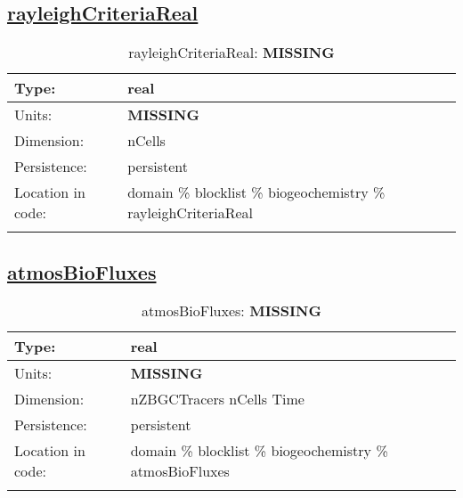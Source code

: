 \subsection[rayleighCriteriaReal]{\hyperref[sec:var_tab_biogeochemistry]{rayleighCriteriaReal}}
\label{subsec:var_sec_biogeochemistry_rayleighCriteriaReal}
\begin{center}
\begin{longtable}{| p{2.0in} | p{4.0in} |}
        \hline 
        Type: & real \\
        \hline 
        Units: & {\bf \color{red} MISSING} \\
        \hline 
        Dimension: & nCells \\
        \hline 
        Persistence: & persistent \\
        \hline 
         Location in code: & domain \% blocklist \% biogeochemistry \% rayleighCriteriaReal \\
         \hline 
    \caption{rayleighCriteriaReal: {\bf \color{red} MISSING}}
\end{longtable}
\end{center}
\subsection[atmosBioFluxes]{\hyperref[sec:var_tab_biogeochemistry]{atmosBioFluxes}}
\label{subsec:var_sec_biogeochemistry_atmosBioFluxes}
\begin{center}
\begin{longtable}{| p{2.0in} | p{4.0in} |}
        \hline 
        Type: & real \\
        \hline 
        Units: & {\bf \color{red} MISSING} \\
        \hline 
        Dimension: & nZBGCTracers nCells Time \\
        \hline 
        Persistence: & persistent \\
        \hline 
         Location in code: & domain \% blocklist \% biogeochemistry \% atmosBioFluxes \\
         \hline 
    \caption{atmosBioFluxes: {\bf \color{red} MISSING}}
\end{longtable}
\end{center}

